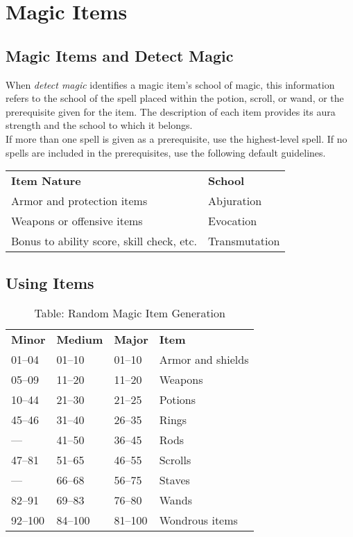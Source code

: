 \chapter{Magic Items}
\section{Magic Items and Detect Magic}

When \textit{detect magic} identifies a magic item's school of magic, this information refers to the school of the spell placed within the potion, scroll, or wand, or the prerequisite given for the item. The description of each item provides its aura strength and the school to which it belongs. \\

If more than one spell is given as a prerequisite, use the highest-level spell. If no spells are included in the prerequisites, use the following default guidelines.\\

\begin{tabular}{ll}
\textbf{Item Nature} & \textbf{School} \\
Armor and protection items & Abjuration\\
Weapons or offensive items & Evocation\\
Bonus to ability score, skill check, etc. & Transmutation\\
\end{tabular}

\section{Using Items}

\begin{table}[]
\sffamily
\caption{Table: Random Magic Item Generation}
\begin{tabular}{llll}
\textbf{Minor} & \textbf{Medium} & \textbf{Major} & \textbf{Item}\\
01–04 & 01–10 & 01–10 & Armor and shields \\
 05–09 & 11–20 & 11–20 & Weapons \\
 10–44 & 21–30 & 21–25 & Potions \\
 45–46 & 31–40 & 26–35 & Rings \\
 — & 41–50 & 36–45 & Rods \\
 47–81 & 51–65 & 46–55 & Scrolls \\
 — & 66–68 & 56–75 & Staves \\
 82–91 & 69–83 & 76–80 & Wands \\
 92–100 & 84–100 & 81–100 & Wondrous items\\
\end{tabular}
\end{table}
			
